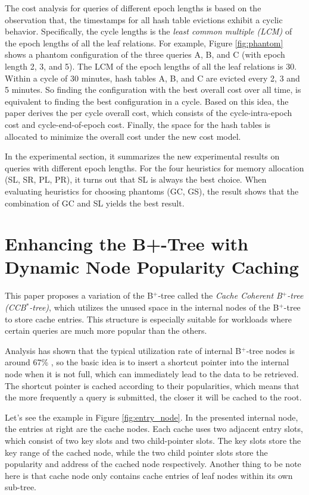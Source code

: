 \documentclass[paper=a4, fontsize=18pt]{article} %
\numberwithin{equation}{section} %
\numberwithin{figure}{section} %
\numberwithin{table}{section} %
\begin{document}
The cost analysis for queries of different epoch lengths is based on the observation that, the timestamps for all hash table evictions exhibit a cyclic behavior. Specifically, the cycle lengths is the \emph{least common multiple (LCM)} of the epoch lengths of all the leaf relations. For example, Figure \ref{fig:phantom} shows a phantom configuration of the three queries A, B, and C (with epoch length 2, 3, and 5). The LCM of the epoch lengths of all the leaf relations is 30. Within a cycle of 30 minutes, hash tables A, B, and C are evicted every 2, 3 and 5 minutes. So finding the configuration with the best overall cost over all time, is equivalent to finding the best configuration in a cycle. Based on this idea, the paper derives the per cycle overall cost, which consists of the cycle-intra-epoch cost and cycle-end-of-epoch cost. Finally, the space for the hash tables is allocated to minimize the overall cost under the new cost model.

In the experimental section, it summarizes the new experimental results on queries with different epoch lengths. For the four heuristics for memory allocation (SL, SR, PL, PR), it turns out that SL is always the best choice. When evaluating heuristics for choosing phantoms (GC, GS), the result shows that the combination of GC and SL yields the best result.

\section{Enhancing the B+-Tree with Dynamic Node Popularity Caching \cite{YU10}}

This paper proposes a variation of the B$^+$-tree called the \emph{Cache Coherent B$^+$-tree (CCB$^*$-tree)}, which utilizes the unused space in the internal nodes of the B$^+$-tree to store cache entries. This structure is especially suitable for workloads where certain queries are much more popular than the others.

Analysis has shown that the typical utilization rate of internal B$^+$-tree nodes is around 67\% \cite{R98}, so the basic idea is to insert a shortcut pointer into the internal node when it is not full, which can immediately lead to the data to be retrieved. The shortcut pointer is cached according to their popularities, which means that the more frequently a query is submitted, the closer it will be cached to the root.

Let's see the example in Figure \ref{fig:entry_node}. In the presented internal node, the entries at right are the cache nodes. Each cache uses two adjacent entry slots, which consist of two key slots and two child-pointer slots. The key slots store the key range of the cached node, while the two child pointer slots store the popularity and address of the cached node respectively. Another thing to be note here is that  cache node only contains cache entries of leaf nodes within its own sub-tree.
\end{document}
